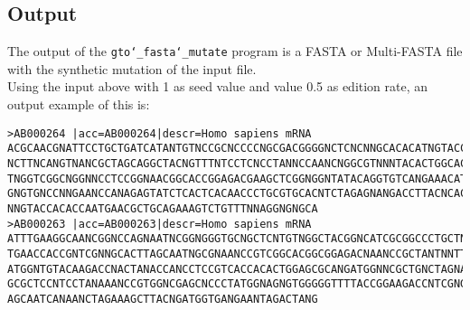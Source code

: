 \subsection*{Output}
The output of the \texttt{gto\char`_fasta\char`_mutate} program is a FASTA or Multi-FASTA file with the synthetic mutation of the input file.\\
Using the input above with 1 as seed value and value 0.5 as edition rate, an output example of this is:
\begin{lstlisting}
>AB000264 |acc=AB000264|descr=Homo sapiens mRNA 
ACGCAACGNATTCCTGCTGATCATANTGTNCCGCNCCCCNGCGACGGGGNCTCNCNNGCACACATNGTACCATTGTCCAC
NCTTNCANGTNANCGCTAGCAGGCTACNGTTTNTCCTCNCCTANNCCAANCNGGCGTNNNTACACTGGCACGTGCAGGCA
TNGGTCGGCNGGNNCCTCCGGNAACGGCACCGGAGACGAAGCTCGGNGGNTATACAGGTGTCANGAAACATCCCCGCGNC
GNGTGNCCNNGAANCCANAGAGTATCTCACTCACAACCCTGCGTGCACNTCTAGAGNANGACCTTACNCACCNTCCCNTT
NNGTACCACACCAATGAACGCTGCAGAAAGTCTGTTTNNAGGNGNGCA
>AB000263 |acc=AB000263|descr=Homo sapiens mRNA 
ATTTGAAGGCAANCGGNCCAGNAATNCGGNGGGTGCNGCTCNTGTNGGCTACGGNCATCGCGGCCCTGCTNTANTAAGCN
TGAACCACCGNTCGNNGCACTTAGCAATNGCGNAANCCGTCGGCACGGCGGAGACNAANCCGCTANTNNTTTCCCGCTNA
ATGGNTGTACAAGACCNACTANACCANCCTCCGTCACCACACTGGAGCGCANGATGGNNCGCTGNCTAGNAGNCNNTGAG
GCGCTCCNTCCTANAAANCCGTGGNCGAGCNCCCTATGGNAGNGTGGGGGTTTTACCGGAAGACCNTCGNGCCCTATGGG
AGCAATCANAANCTAGAAAGCTTACNGATGGTGANGAANTAGACTANG
\end{lstlisting}